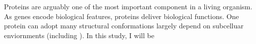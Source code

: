 Proteins are arguably one of the most important component in a living organism. As genes encode biological features, proteins deliver biological functions. One protein can adopt many structural conformations largely depend on subcelluar enviornments (including ).    In this study, I will be 